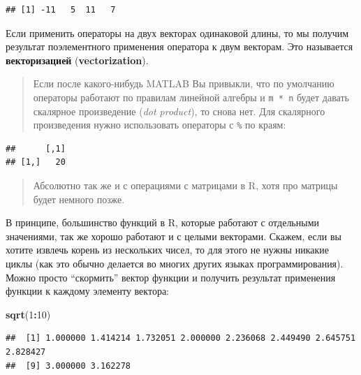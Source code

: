\documentclass[]{book}
\newenvironment{Shaded}{\begin{snugshade}}{\end{snugshade}}
\newcommand{\KeywordTok}[1]{\textcolor[rgb]{0.13,0.29,0.53}{\textbf{#1}}}
\newcommand{\DecValTok}[1]{\textcolor[rgb]{0.00,0.00,0.81}{#1}}
\newcommand{\StringTok}[1]{\textcolor[rgb]{0.31,0.60,0.02}{#1}}
\newcommand{\OperatorTok}[1]{\textcolor[rgb]{0.81,0.36,0.00}{\textbf{#1}}}
\newcommand{\NormalTok}[1]{#1}
\begin{document}
\begin{verbatim}
## [1] -11   5  11   7
\end{verbatim}

Если применить операторы на двух векторах одинаковой длины, то мы
получим результат поэлементного применения оператора к двум векторам.
Это называется \textbf{векторизацией} (\textbf{vectorization}).

\begin{quote}
Если после какого-нибудь MATLAB Вы привыкли, что по умолчанию операторы
работают по правилам линейной алгебры и \texttt{m\ *\ n} будет давать
скалярное произведение (\emph{dot product}), то снова нет. Для
скалярного произведения нужно использовать операторы с \texttt{\%} по
краям:
\end{quote}

\begin{Shaded}
\end{Shaded}

\begin{verbatim}
##      [,1]
## [1,]   20
\end{verbatim}

\begin{quote}
Абсолютно так же и с операциями с матрицами в R, хотя про матрицы будет
немного позже.
\end{quote}

В принципе, большинство функций в R, которые работают с отдельными
значениями, так же хорошо работают и с целыми векторами. Скажем, если вы
хотите извлечь корень из нескольких чисел, то для этого не нужны никакие
циклы (как это обычно делается во многих других языках
программирования). Можно просто ``скормить'' вектор функции и получить
результат применения функции к каждому элементу вектора:

\begin{Shaded}
\begin{Highlighting}[]
\KeywordTok{sqrt}\NormalTok{(}\DecValTok{1}\OperatorTok{:}\DecValTok{10}\NormalTok{)}
\end{Highlighting}
\end{Shaded}

\begin{verbatim}
##  [1] 1.000000 1.414214 1.732051 2.000000 2.236068 2.449490 2.645751 2.828427
##  [9] 3.000000 3.162278
\end{verbatim}
\end{document}

